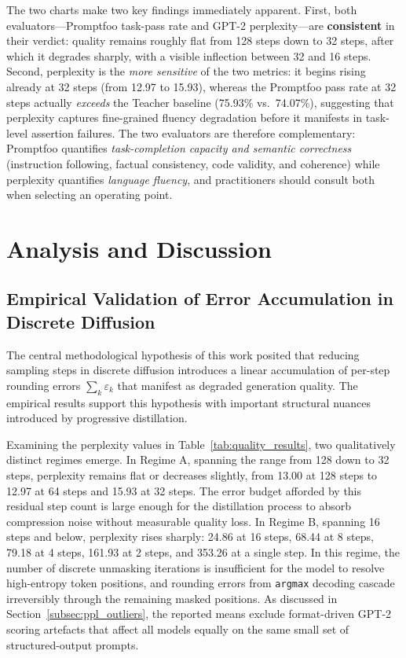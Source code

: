 \documentclass[11pt, a4paper]{article}
\begin{document}
\noindent The two charts make two key findings immediately apparent. First, both evaluators---Promptfoo task-pass rate and GPT-2 perplexity---are \textbf{consistent} in their verdict: quality remains roughly flat from 128 steps down to 32 steps, after which it degrades sharply, with a visible inflection between 32 and 16 steps. Second, perplexity is the \emph{more sensitive} of the two metrics: it begins rising already at 32 steps (from 12.97 to 15.93), whereas the Promptfoo pass rate at 32 steps actually \emph{exceeds} the Teacher baseline (75.93\% vs.\ 74.07\%), suggesting that perplexity captures fine-grained fluency degradation before it manifests in task-level assertion failures. The two evaluators are therefore complementary: Promptfoo quantifies \emph{task-completion capacity and semantic correctness} (instruction following, factual consistency, code validity, and coherence) while perplexity quantifies \emph{language fluency}, and practitioners should consult both when selecting an operating point.

\section{Analysis and Discussion}
\label{sec:analysis}

\subsection{Empirical Validation of Error Accumulation in Discrete Diffusion}
\label{subsec:error_accumulation_analysis}

The central methodological hypothesis of this work posited that reducing sampling steps in discrete diffusion introduces a linear accumulation of per-step rounding errors $\sum_k \varepsilon_k$ that manifest as degraded generation quality. The empirical results support this hypothesis with important structural nuances introduced by progressive distillation.

Examining the perplexity values in Table~\ref{tab:quality_results}, two qualitatively distinct regimes emerge. In Regime A, spanning the range from 128 down to 32 steps, perplexity remains flat or decreases slightly, from 13.00 at 128 steps to 12.97 at 64 steps and 15.93 at 32 steps. The error budget afforded by this residual step count is large enough for the distillation process to absorb compression noise without measurable quality loss. In Regime B, spanning 16 steps and below, perplexity rises sharply: 24.86 at 16 steps, 68.44 at 8 steps, 79.18 at 4 steps, 161.93 at 2 steps, and 353.26 at a single step. In this regime, the number of discrete unmasking iterations is insufficient for the model to resolve high-entropy token positions, and rounding errors from \texttt{argmax} decoding cascade irreversibly through the remaining masked positions. As discussed in Section~\ref{subsec:ppl_outliers}, the reported means exclude format-driven GPT-2 scoring artefacts that affect all models equally on the same small set of structured-output prompts.
\end{document}
